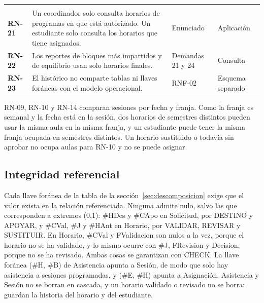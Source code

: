 {\begin{xltabular}{\linewidth}{>{\bfseries}p{11mm}L{1.35}L{0.75}L{0.6}}
 \\
RN-21 & Un coordinador solo consulta horarios de programas en que está autorizado. Un estudiante solo consulta los horarios que tiene asignados. & Enunciado & Aplicación \\
RN-22 & Los reportes de bloques más impartidos y de equilibrio usan solo horarios finales. & Demandas 21 y 24 & Consulta \\
RN-23 & El histórico no comparte tablas ni llaves foráneas con el modelo operacional. & RNF-02 & Esquema separado \\
\end{xltabular}}

RN-09, RN-10 y RN-14 comparan sesiones por fecha y franja. Como la franja es semanal y la fecha está en la sesión, dos horarios de semestres distintos pueden usar la misma aula en la misma franja, y un estudiante puede tener la misma franja ocupada en semestres distintos. Un horario sustituido o todavía sin aprobar no ocupa aulas para RN-10 y no se puede asignar.

\subsection{Integridad referencial}

Cada llave foránea de la tabla de la sección~\ref{sec:descomposicion} exige que el valor exista en la relación referenciada. Ninguna admite nulo, salvo las que corresponden a extremos (0,1): \#HDes y \#CApo en Solicitud, por DESTINO y APOYAR, y \#CVal, \#J y \#HAnt en Horario, por VALIDAR, REVISAR y SUSTITUIR. En Horario, \#CVal y FValidacion son nulos a la vez, porque el horario no se ha validado, y lo mismo ocurre con \#J, FRevision y Decision, porque no se ha revisado. Ambas cosas se garantizan con CHECK. La llave foránea (\#H, \#B) de Asistencia apunta a Sesión, de modo que solo hay asistencia a sesiones programadas, y (\#E, \#H) apunta a Asignación. Asistencia y Sesión no se borran en cascada, y un horario validado o revisado no se borra: guardan la historia del horario y del estudiante.
